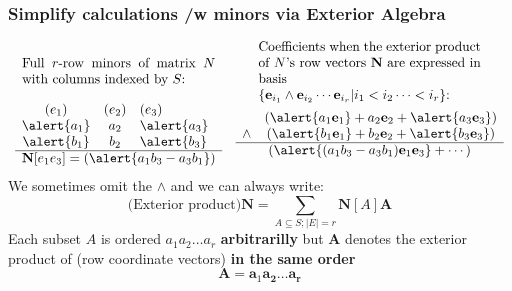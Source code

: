 \documentclass{beamer}
\newcommand{\ext}[1]{\ensuremath{\mathbf{#1}}}
\begin{document}
\begin{frame}
  \frametitle{Simplify calculations /w minors via Exterior Algebra}
  \[
  \begin{array}{cc}
     \begin{minipage}{2in}Full $r$-row minors of matrix $N$ with columns indexed by $S$: 
     \end{minipage}
    &
     \begin{minipage}{2.3in}Coefficients when the exterior product of $N$'s row vectors $\ext{N}$
       are expressed in basis\\
       $\{\ext{e}_{i_1}\wedge\ext{e}_{i_2}\cdots\ext{e}_{i_r}|i_1<i_2\cdots<i_r\}$:
     \end{minipage}\\
    \begin{array}{ccl}
      (e_1) & (e_2) & (e_3) \\ 
      \alert{a_1} & a_2 & \alert{a_3} \\
      \alert{b_1} & b_2 & \alert{b_3} \\ \hline
      \multicolumn{3}{c}{\ext{N}[e_1e_3]=(\alert{a_1b_3-a_3b_1})}
    \end{array} 
    &
    \begin{array}{cc}
             & (\alert{a_1\mathbf{e}_1}+a_2\mathbf{e}_2+\alert{a_3\mathbf{e}_3}) \\
      \wedge & (\alert{b_1\mathbf{e}_1}+b_2\mathbf{e}_2+\alert{b_3\mathbf{e}_3}) \\ \hline
      \multicolumn{2}{c}{( 
      \alert{(a_1b_3-a_3b_1)\mathbf{e}_1\mathbf{e}_3} +
      \cdots
      )}
    \end{array} 
  \end{array}
  \]
  We sometimes omit the $\wedge$ and we can always write:
  \[
  \text{(Exterior product)} \ext{N} = \sum_{A\subseteq S; |E|=r}\ext{N}[A]\ext{A}
  \]
  Each subset $A$ is ordered $a_1 a_2 \ldots a_r$ \textbf{arbitrarilly} but $\ext{A}$
  denotes the exterior product of (row coordinate vectors) \textbf{in the same order}
  \[
  \ext{A} = \ext{a}_1\ext{a_2}\ldots\ext{a_r}
  \]
\end{frame}
\end{document}
